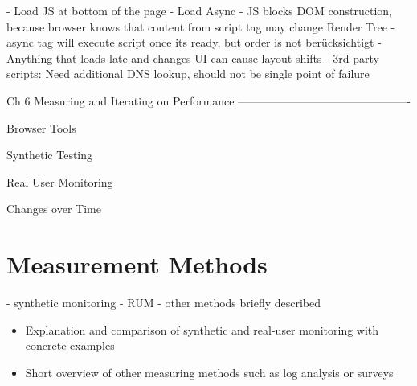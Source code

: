 - Load JS at bottom of the page
- Load Async
- JS blocks DOM construction, because browser knows that content from script tag may change Render Tree
- async tag will execute script once its ready, but order is not berücksichtigt
- Anything that loads late and changes UI can cause layout shifts
- 3rd party scripts: Need additional DNS lookup, should not be single point of failure







Ch 6 Measuring and Iterating on Performance
----------------------------------------------

Browser Tools


Synthetic Testing


Real User Monitoring


Changes over Time













\section{Measurement Methods}


- synthetic monitoring
- RUM
- other methods briefly described


\begin{itemize}
\item Explanation and comparison of synthetic and real-user monitoring with concrete examples
\item Short overview of other measuring methods such as log analysis or surveys
\end{itemize}








